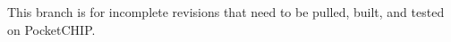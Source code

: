 This branch is for incomplete revisions that need to be pulled, built, and tested on Pocket\+C\+H\+IP. 